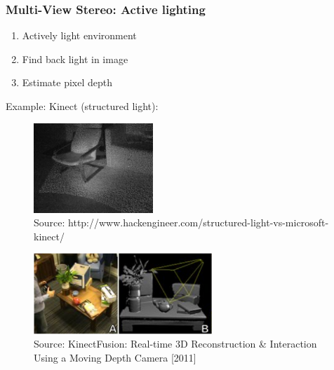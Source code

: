 \documentclass{beamer}
\begin{document}
\begin{frame}
  \frametitle{Multi-View Stereo: Active lighting} %
  \begin{enumerate}
    \item Actively light environment
    \item Find back light in image
    \item Estimate pixel depth
  \end{enumerate}
  Example: Kinect (structured light):
  \begin{figure}[htb!]
   \centering
   \includegraphics[width=0.4\textwidth]{img/kinect_pattern}
   \caption*{\tiny Source: http://www.hackengineer.com/structured-light-vs-microsoft-kinect/}
   \label{fig:kinect_pattern}
  \end{figure}
  \begin{figure}[htb!]
   \centering
   \includegraphics[width=0.6\textwidth]{img/kinect}
   \caption*{\tiny Source: KinectFusion: Real-time 3D Reconstruction \& Interaction Using a Moving Depth Camera [2011]}
   \label{fig:kinect}
  \end{figure}
\end{frame}
\end{document}
